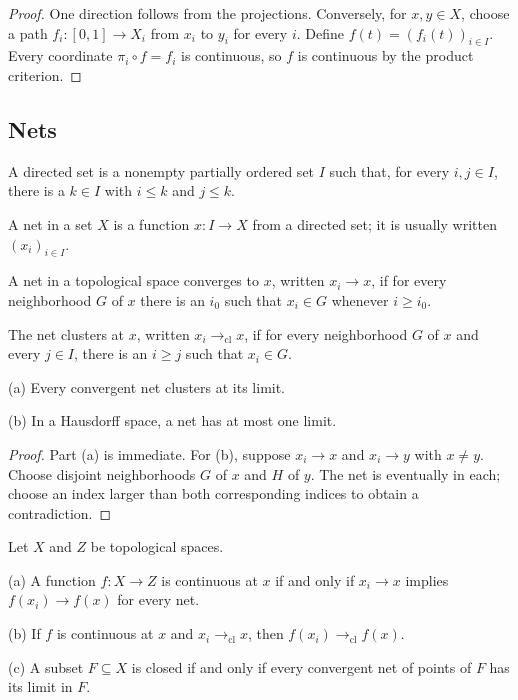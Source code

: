\begin{proof}
One direction follows from the projections. Conversely, for $x,y\in X$,
choose a path $f_i:[0,1]\to X_i$ from $x_i$ to $y_i$ for every $i$. Define
$f(t)=(f_i(t))_{i\in I}$. Every coordinate $\pi_i\circ f=f_i$ is continuous,
so $f$ is continuous by the product criterion.
\end{proof}

\subsection{Nets}

\begin{de}
A directed set is a nonempty partially ordered set $I$ such that, for every
$i,j\in I$, there is a $k\in I$ with $i\leq k$ and $j\leq k$.

A net in a set $X$ is a function $x:I\to X$ from a directed set; it is usually
written $(x_i)_{i\in I}$.

A net in a topological space converges to $x$, written $x_i\to x$, if for
every neighborhood $G$ of $x$ there is an $i_0$ such that $x_i\in G$ whenever
$i\geq i_0$.

The net clusters at $x$, written $x_i\to_{\mathrm{cl}}x$, if for every
neighborhood $G$ of $x$ and every $j\in I$, there is an $i\geq j$ such that
$x_i\in G$.
\end{de}

\begin{thm}
(a) Every convergent net clusters at its limit.

(b) In a Hausdorff space, a net has at most one limit.
\end{thm}

\begin{proof}
Part (a) is immediate. For (b), suppose $x_i\to x$ and $x_i\to y$ with
$x\neq y$. Choose disjoint neighborhoods $G$ of $x$ and $H$ of $y$. The net
is eventually in each; choose an index larger than both corresponding
indices to obtain a contradiction.
\end{proof}

\begin{thm}
Let $X$ and $Z$ be topological spaces.

(a) A function $f:X\to Z$ is continuous at $x$ if and only if
$x_i\to x$ implies $f(x_i)\to f(x)$ for every net.

(b) If $f$ is continuous at $x$ and $x_i\to_{\mathrm{cl}}x$, then
$f(x_i)\to_{\mathrm{cl}}f(x)$.

(c) A subset $F\subseteq X$ is closed if and only if every convergent net of
points of $F$ has its limit in $F$.
\end{thm}

